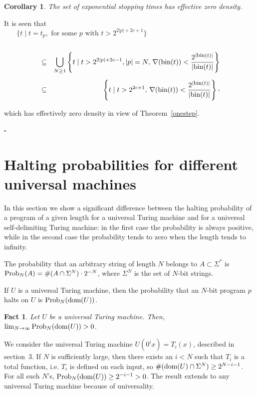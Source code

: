 \documentclass[12pt,twoside,openright]{report}
\newcommand{\QED}{\hfill $\square$}
\newcommand{\dom}{\mbox{\rm dom}}
\newcommand{\bin}{\mbox{bin}}
\newcommand{\fbin}{\mbox{\rm \footnotesize{bin}}}
\newcommand{\Prob}{{\rm Prob}}
\newtheorem{fact}[thm]{Fact}
\newtheorem{cor}[thm]{Corollary}
\newcommand{\myproof}{\noindent {\em Proof.}  }
\begin{document}
\begin{cor}
The set of exponential stopping times has effective zero density.
\end{cor}

\myproof It is seen that 
\[ \{t \mid t=t_{p}, \mbox{  for some } p \mbox{  with  } t > 2^{2|p|+2c+1}\}  \phantom{xxxxxxxxxxxxxxxxxxxxxxxx}\]\\[-7ex]
\begin{eqnarray*}
&\subseteq & \bigcup_{N\ge 1}\left\{ t \mid  t >  2^{2|p|+2c-1}, |p|=N, \, \nabla (\bin(t)) < \frac{2^{|\fbin (t)|}}{|\bin(t)|}\right\}\\[1ex]
&\subseteq & \left\{ t \mid  t >  2^{2c+1},  \, \nabla (\bin(t)) < \frac{2^{|\fbin (t)|}}{|\bin(t)|}\right\}\raisebox{0.5ex},
\end{eqnarray*}

\noindent which has effectively zero density in view of Theorem~\ref{onestep}.

\QED
   
\section{Halting probabilities for different universal machines}

In this section we show a significant difference between the halting probability of a program of a given length for a universal Turing machine and for a universal self-delimiting  Turing machine: in the first case the probability is always positive, while in the second case the probability tends to zero when the length tends to infinity.

\medskip

The probability that an arbitrary string of length $N$ belongs to $A \subset \Sigma^{*}$ is $\Prob_{N}(A) = \#(A\cap \Sigma^{N})\cdot 2^{-N}$, where $ \Sigma^{N}$ is the set of $N$-bit strings. 

If $U$ is a universal Turing machine, then the probability that an $N$-bit program $p$ halts on $U$ is  $\Prob_{N}(\dom (U))$. 

\medskip

\begin{fact} 
Let $U$ be a universal Turing machine. Then, $\lim_{N \rightarrow \infty} \Prob_{N}(\dom (U)) >0$. 
\end{fact}
\myproof We consider the universal Turing machine $U(0^{i}x) = T_{i}(x)$, described in section~3.   If $N$ is sufficiently large, then there exists an $i <N$ such that $T_{i}$ is a total function, i.e. $T_{i}$  is defined on each input, so  $\#(\dom (U) \cap \Sigma^{N}) \ge 2^{N-i-1}$. For all  such  $N$'s, $\Prob_{N}(\dom (U)) \ge 2^{-i-1}>0$.  The result extends to any universal Turing machine because of universality.
\end{document}
